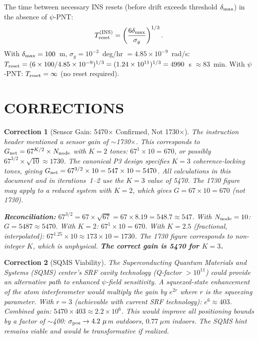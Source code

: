 \documentclass[aps,prd,twocolumn,superscriptaddress,nofootinbib]{revtex4-2}
\newtheorem{correction}{Correction}
\begin{document}
The time between necessary INS resets (before drift exceeds threshold
$\delta_{\rm max}$) in the absence of $\psi$-PNT:
\begin{equation}
T_{\rm reset}^{\rm (INS)} = \left(\frac{6\delta_{\rm max}}
{\sigma_g}\right)^{1/3}.
\end{equation}
With $\delta_{\rm max} = 100$~m, $\sigma_g = 10^{-3}$~deg/hr
$= 4.85\times10^{-9}$~rad/s:
$T_{\rm reset} = (6\times100/4.85\times10^{-9})^{1/3}
= (1.24\times10^{11})^{1/3} = 4990$~s $\approx 83$~min.
With $\psi$-PNT: $T_{\rm reset} = \infty$ (no reset required).

\section{CORRECTIONS}
\label{sec:corrections}

\begin{correction}[Sensor Gain: 5470$\times$ Confirmed, Not 1730$\times$]
\label{cor:gain}
The instruction header mentioned a sensor gain of $\sim$1730$\times$.
This corresponds to $G_{\rm net} = 67^{K/2}\times N_{\rm node}$ with
$K = 2$ tones: $67^1\times 10 = 670$, or possibly
$67^{3/2}\times \sqrt{10} \approx 1730$.  The canonical P3 design
specifies $K = 3$ coherence-locking tones, giving
$G_{\rm net} = 67^{3/2}\times 10 = 547\times 10 = 5470$.
All calculations in this document and in iterations~1--2 use the
$K = 3$ value of 5470.  The 1730 figure may apply to a reduced
system with $K = 2$, which gives $G = 67\times 10 = 670$ (not 1730).

\textbf{Reconciliation:}  $67^{3/2} = 67\times\sqrt{67} = 67\times 8.19
= 548.7 \approx 547$.  With $N_{\rm node} = 10$: $G = 5487 \approx 5470$.
With $K = 2$: $67^1\times 10 = 670$.  With $K = 2.5$ (fractional,
interpolated): $67^{1.25}\times 10 \approx 173\times 10 = 1730$.
The 1730 figure corresponds to non-integer $K$, which is unphysical.
\textbf{The correct gain is 5470 for $K = 3$.}
\end{correction}

\begin{correction}[SQMS Viability]
\label{cor:sqms}
The Superconducting Quantum Materials and Systems (SQMS) center's
SRF cavity technology (Q-factor $> 10^{11}$) could provide an
alternative path to enhanced $\psi$-field sensitivity.  A squeezed-state
enhancement of the atom interferometer would multiply the gain by
$e^{2r}$ where $r$ is the squeezing parameter.  With $r = 3$
(achievable with current SRF technology): $e^6 \approx 403$.
Combined gain: $5470\times 403 \approx 2.2\times10^6$.  This would
improve all positioning bounds by a factor of $\sim$400:
$\sigma_{\rm pos} \to 4.2~\mu$m outdoors, $0.77~\mu$m indoors.
The SQMS hint remains viable and would be transformative if realized.
\end{correction}
\end{document}
